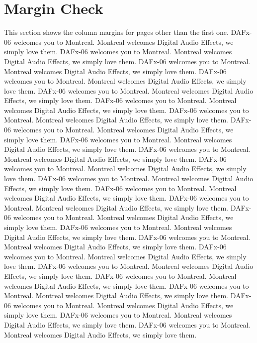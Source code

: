 \documentclass[twoside]{article}
\begin{document}
\section{Margin Check}
This section shows the column margins for pages other than the first one. \bigskip\newline
DAFx-06 welcomes you to Montreal. Montreal welcomes Digital Audio Effects, we simply love them. 
DAFx-06 welcomes you to Montreal. Montreal welcomes Digital Audio Effects, we simply love them. 
DAFx-06 welcomes you to Montreal. Montreal welcomes Digital Audio Effects, we simply love them. 
DAFx-06 welcomes you to Montreal. Montreal welcomes Digital Audio Effects, we simply love them. 
DAFx-06 welcomes you to Montreal. Montreal welcomes Digital Audio Effects, we simply love them. 
DAFx-06 welcomes you to Montreal. Montreal welcomes Digital Audio Effects, we simply love them. 
DAFx-06 welcomes you to Montreal. Montreal welcomes Digital Audio Effects, we simply love them. 
DAFx-06 welcomes you to Montreal. Montreal welcomes Digital Audio Effects, we simply love them. 
DAFx-06 welcomes you to Montreal. Montreal welcomes Digital Audio Effects, we simply love them. 
DAFx-06 welcomes you to Montreal. Montreal welcomes Digital Audio Effects, we simply love them. 
DAFx-06 welcomes you to Montreal. Montreal welcomes Digital Audio Effects, we simply love them. 
DAFx-06 welcomes you to Montreal. Montreal welcomes Digital Audio Effects, we simply love them. 
DAFx-06 welcomes you to Montreal. Montreal welcomes Digital Audio Effects, we simply love them. 
DAFx-06 welcomes you to Montreal. Montreal welcomes Digital Audio Effects, we simply love them. 
DAFx-06 welcomes you to Montreal. Montreal welcomes Digital Audio Effects, we simply love them. 
DAFx-06 welcomes you to Montreal. Montreal welcomes Digital Audio Effects, we simply love them. 
DAFx-06 welcomes you to Montreal. Montreal welcomes Digital Audio Effects, we simply love them. 
DAFx-06 welcomes you to Montreal. Montreal welcomes Digital Audio Effects, we simply love them. 
DAFx-06 welcomes you to Montreal. Montreal welcomes Digital Audio Effects, we simply love them. 
DAFx-06 welcomes you to Montreal. Montreal welcomes Digital Audio Effects, we simply love them. 
DAFx-06 welcomes you to Montreal. Montreal welcomes Digital Audio Effects, we simply love them. 
DAFx-06 welcomes you to Montreal. Montreal welcomes Digital Audio Effects, we simply love them. 
DAFx-06 welcomes you to Montreal. Montreal welcomes Digital Audio Effects, we simply love them. 
DAFx-06 welcomes you to Montreal. Montreal welcomes Digital Audio Effects, we simply love them. 
\end{document}
